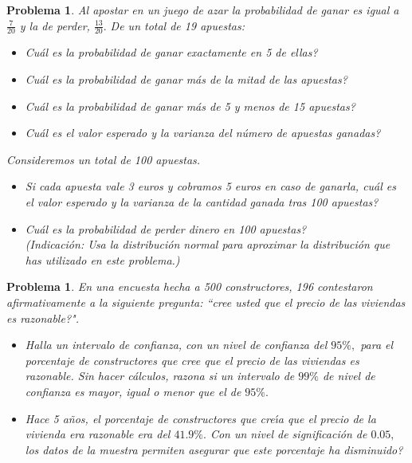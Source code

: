 \documentclass[a4paper,10pt]{article}
\newcounter{prbcont}
\newtheorem{problema}[prbcont]{Problema}
\begin{document}
\begin{problema}
Al apostar en un juego de azar la probabilidad de ganar es igual a $\frac {7}{20}$ y la de perder,
$\frac {13}{20}.$ De un total de 19 apuestas:
\begin{itemize} 
\item[(a)] Cu\'al es la probabilidad de ganar exactamente en 5 de ellas?
\item[(b)] Cu\'al es la probabilidad de ganar m\'as de la mitad de las apuestas?
\item[(c)] Cu\'al es la probabilidad de ganar m\'as de 5 y menos de 15 apuestas?
\item[(d)] Cu\'al es el valor esperado y la varianza del n\'umero de apuestas ganadas? 
\end{itemize}
Consideremos un total de 100 apuestas. 
\begin{itemize}
\item[(e)] Si cada apuesta vale 3 euros y cobramos 5 euros en caso de ganarla, cu\'al es el valor
esperado y la varianza de la cantidad ganada tras 100 apuestas?
\item[(f)] Cu\'al es la probabilidad de perder dinero en 100 apuestas?\\ (Indicaci\'on:
Usa la distribuci\'on normal para aproximar la distribuci\'on que has utilizado en este problema.) 
\end{itemize}
\end{problema}

\begin{problema}
En una encuesta hecha a 500 constructores, 196 contestaron afirmativamente a la siguiente pregunta:
``cree usted que el precio de las viviendas es razonable?".
\begin{itemize}
\item [(a)] Halla un intervalo de confianza, con un nivel de confianza del $95\%,$ para el
porcentaje de constructores que cree que el precio de las viviendas es razonable. Sin hacer c\'alculos, razona si un intervalo de $99\%$ de nivel de confianza es mayor, igual o menor que el de $95\%.$
\item[(b)] Hace 5 a\~nos, el porcentaje de constructores que cre\'{\i}a que el precio de la vivienda era razonable era del $41.9\%.$ Con un nivel de significaci\'on de $0.05,$ los datos de la muestra permiten asegurar que este porcentaje ha disminuido?
\end{itemize}
\end{problema}
\end{document}
